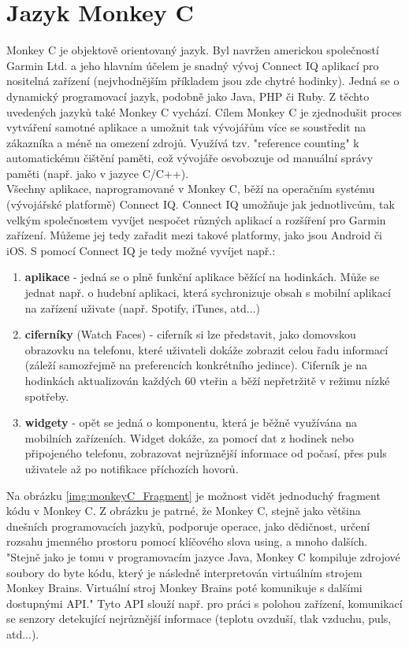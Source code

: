 \chapter{Jazyk Monkey C} \label{2Chapter}
Monkey C \cite{monkeyc_2021} je objektově orientovaný jazyk. Byl navržen americkou společností Garmin Ltd. \cite{GARMIN_OFFICIAL} a jeho hlavním účelem je snadný vývoj Connect IQ aplikací pro nositelná zařízení (nejvhodnějším příkladem jsou zde chytré hodinky). Jedná se o dynamický programovací jazyk, podobně jako Java, PHP či Ruby. Z těchto uvedených jazyků také Monkey C vychází. Cílem Monkey C je zjednodušit proces vytváření samotné aplikace a umožnit tak vývojářům více se soustředit na zákazníka a méně na omezení zdrojů. Využívá tzv. "reference counting" k automatickému čištění paměti, což vývojáře osvobozuje od manuální správy paměti (např. jako v jazyce C/C++).
\\
Všechny aplikace, naprogramované v Monkey C, běží na operačním systému (vývojářské platformě) Connect IQ. \cite{Garmin_Connect_IQ} Connect IQ umožňuje jak jednotlivcům, tak velkým společnostem vyvíjet nespočet různých aplikací a rozšíření pro Garmin zařízení. Můžeme jej tedy zařadit mezi takové platformy, jako jsou Android či iOS. S pomocí Connect IQ je tedy možné vyvíjet např.:

\begin{enumerate}
\item \textbf{aplikace} - jedná se o plně funkční aplikace běžící na hodinkách. Může se jednat např. o hudební aplikaci, která sychronizuje obsah s mobilní aplikací na zařízení uživate (např. Spotify, iTunes, atd...)
\item \textbf{ciferníky} (Watch Faces) - ciferník si lze představit, jako domovskou obrazovku na telefonu, které uživateli dokáže zobrazit celou řadu informací (záleží samozřejmě na preferencích konkrétního jedince). Ciferník je na hodinkách aktualizován každých 60 vteřin a běží nepřetržitě v režimu nízké spotřeby.
\item \textbf{widgety} - opět se jedná o komponentu, která je běžně využívána na mobilních zařízeních. Widget dokáže, za pomocí dat z hodinek nebo připojeného telefonu, zobrazovat nejrůznější informace od počasí, přes puls uživatele až po notifikace příchozích hovorů. 
\end{enumerate}

Na obrázku \ref{img:monkeyC_Fragment} je možnost vidět jednoduchý fragment kódu v Monkey C. Z obrázku je patrné, že Monkey C, stejně jako většina dnešních programovacích jazyků, podporuje operace, jako dědičnost, určení rozsahu jmenného prostoru pomocí klíčového slova using, a mnoho dalších. "Stejně jako je tomu v programovacím jazyce Java, Monkey C kompiluje zdrojové soubory do byte kódu, který je následně interpretován virtuálním strojem Monkey Brains. Virtuální stroj Monkey Brains poté komunikuje s dalšími dostupnými API." \cite{věnsek_2019} Tyto API slouží např. pro práci s polohou zařízení, komunikací se senzory detekující nejrůznější informace (teplotu ovzduší, tlak vzduchu, puls, atd...).


